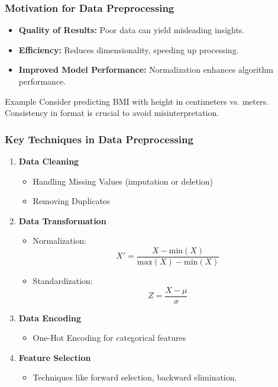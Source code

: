 \documentclass[aspectratio=169]{beamer}
\begin{document}
\begin{frame}[fragile]
    \frametitle{Motivation for Data Preprocessing}
    \begin{itemize}
        \item \textbf{Quality of Results:} Poor data can yield misleading insights.
        \item \textbf{Efficiency:} Reduces dimensionality, speeding up processing.
        \item \textbf{Improved Model Performance:} Normalization enhances algorithm performance.
    \end{itemize}
    
    \begin{block}{Example}
        Consider predicting BMI with height in centimeters vs. meters. Consistency in format is crucial to avoid misinterpretation.
    \end{block}
\end{frame}

\begin{frame}[fragile]
    \frametitle{Key Techniques in Data Preprocessing}
    \begin{enumerate}
        \item \textbf{Data Cleaning}
            \begin{itemize}
                \item Handling Missing Values (imputation or deletion)
                \item Removing Duplicates
            \end{itemize}
        \item \textbf{Data Transformation}
            \begin{itemize}
                \item Normalization: 
                \begin{equation}
                X' = \frac{X - \text{min}(X)}{\text{max}(X) - \text{min}(X)}
                \end{equation}
                \item Standardization:
                \begin{equation}
                Z = \frac{X - \mu}{\sigma}
                \end{equation}
            \end{itemize}
        \item \textbf{Data Encoding}
            \begin{itemize}
                \item One-Hot Encoding for categorical features
            \end{itemize}
        \item \textbf{Feature Selection}
            \begin{itemize}
                \item Techniques like forward selection, backward elimination.
            \end{itemize}
    \end{enumerate}
\end{frame}
\end{document}
